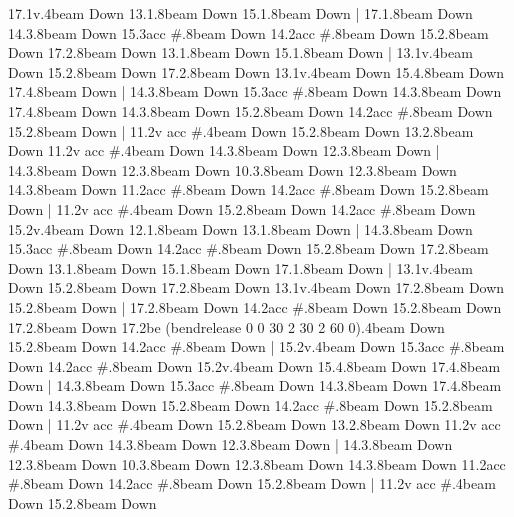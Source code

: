       17.1{v}.4{beam Down}
      13.1.8{beam Down}
      15.1.8{beam Down}
    |
      17.1.8{beam Down}
      14.3.8{beam Down}
      15.3{acc #}.8{beam Down}
      14.2{acc #}.8{beam Down}
      15.2.8{beam Down}
      17.2.8{beam Down}
      13.1.8{beam Down}
      15.1.8{beam Down}
    |
      13.1{v}.4{beam Down}
      15.2.8{beam Down}
      17.2.8{beam Down}
      13.1{v}.4{beam Down}
      15.4.8{beam Down}
      17.4.8{beam Down}
    |
      14.3.8{beam Down}
      15.3{acc #}.8{beam Down}
      14.3.8{beam Down}
      17.4.8{beam Down}
      14.3.8{beam Down}
      15.2.8{beam Down}
      14.2{acc #}.8{beam Down}
      15.2.8{beam Down}
    |
      11.2{v acc #}.4{beam Down}
      15.2.8{beam Down}
      13.2.8{beam Down}
      11.2{v acc #}.4{beam Down}
      14.3.8{beam Down}
      12.3.8{beam Down}
    |
      14.3.8{beam Down}
      12.3.8{beam Down}
      10.3.8{beam Down}
      12.3.8{beam Down}
      14.3.8{beam Down}
      11.2{acc #}.8{beam Down}
      14.2{acc #}.8{beam Down}
      15.2.8{beam Down}
    |
      11.2{v acc #}.4{beam Down}
      15.2.8{beam Down}
      14.2{acc #}.8{beam Down}
      15.2{v}.4{beam Down}
      12.1.8{beam Down}
      13.1.8{beam Down}
    |
      14.3.8{beam Down}
      15.3{acc #}.8{beam Down}
      14.2{acc #}.8{beam Down}
      15.2.8{beam Down}
      17.2.8{beam Down}
      13.1.8{beam Down}
      15.1.8{beam Down}
      17.1.8{beam Down}
    |
      13.1{v}.4{beam Down}
      15.2.8{beam Down}
      17.2.8{beam Down}
      13.1{v}.4{beam Down}
      17.2.8{beam Down}
      15.2.8{beam Down}
    |
      17.2.8{beam Down}
      14.2{acc #}.8{beam Down}
      15.2.8{beam Down}
      17.2.8{beam Down}
      17.2{be (bendrelease 0 0 30 2 30 2 60 0)}.4{beam Down}
      15.2.8{beam Down}
      14.2{acc #}.8{beam Down}
    |
      15.2{v}.4{beam Down}
      15.3{acc #}.8{beam Down}
      14.2{acc #}.8{beam Down}
      15.2{v}.4{beam Down}
      15.4.8{beam Down}
      17.4.8{beam Down}
    |
      14.3.8{beam Down}
      15.3{acc #}.8{beam Down}
      14.3.8{beam Down}
      17.4.8{beam Down}
      14.3.8{beam Down}
      15.2.8{beam Down}
      14.2{acc #}.8{beam Down}
      15.2.8{beam Down}
    |
      11.2{v acc #}.4{beam Down}
      15.2.8{beam Down}
      13.2.8{beam Down}
      11.2{v acc #}.4{beam Down}
      14.3.8{beam Down}
      12.3.8{beam Down}
    |
      14.3.8{beam Down}
      12.3.8{beam Down}
      10.3.8{beam Down}
      12.3.8{beam Down}
      14.3.8{beam Down}
      11.2{acc #}.8{beam Down}
      14.2{acc #}.8{beam Down}
      15.2.8{beam Down}
    |
      11.2{v acc #}.4{beam Down}
      15.2.8{beam Down}
